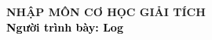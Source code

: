 \begin{frame}[noframenumbering]
    \thispagestyle{empty}
    \bfseries
    \begin{flushleft}
        \vfill
        \vspace{5mm}
        \textcolor{BlueDefault}{\huge \bfseries NHẬP MÔN CƠ HỌC GIẢI TÍCH} \\
        \vspace{8mm}
        \textcolor{black}{\large \bfseries Người trình bày: Log}
        \vfill
    \end{flushleft}
\end{frame}